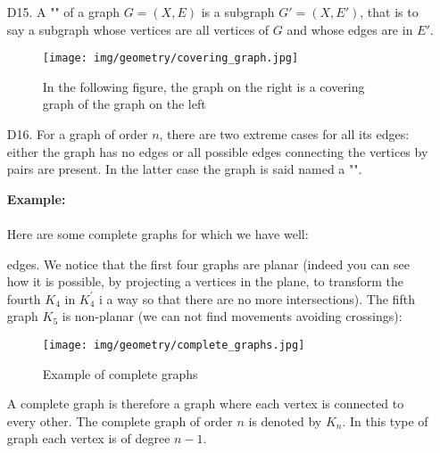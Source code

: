 {\begin{enumerate}
	If $G'$ is a subgraph of $G$ and $u$ and $w$ are vertices of $G'$, then by the definition of a subgraph, $u$ and $w$ are also vertices of $G$. However, if $u$ and $w$ are adjacent in $G$ (i.e., there is an edge of $G$ joining them), the definition of subgraph does not require that the edge joining them in $G$ is also an edge of $G'$. If the subgraph $g'$ has the property that whenever two of its vertices are joined by an edge in $G$, this edge is also in $G'$, then we say that $G'$ is an induced subgraph. 
	
	Here is an example of two subgraphs of G, defined on the same set of vertices where one is an induced subgraph and the other isn't:
	
	\begin{figure}[H]
		\centering
		\texttt{[image: img/geometry/subgraph\_inducedsubgraph.jpg]}
		\caption{Left is a subgraph, right is an induced graph}
	\end{figure}
	
	\item[D15.] A "" of a graph $G=(X,E)$ is a subgraph $G'=(X,E')$, that is to say a subgraph whose vertices are all vertices of $G$ and whose edges are in $E'$.
	
	\begin{figure}[H]
		\centering
		\texttt{[image: img/geometry/covering\_graph.jpg]}
		\caption[]{In the following figure, the graph on the right is a covering graph of the graph on the left}
	\end{figure}
	
	\item[D16.] For a graph of order $n$, there are two extreme cases for all its edges: either the graph has no edges or all possible edges connecting the vertices by pairs are present. In the latter case the graph is said named a "".
	\begin{tcolorbox}[colframe=black,colback=white,sharp corners]
	\textbf{{\Large {}}Example:}\\\\
	Here are some complete graphs for which we have well:
	
	edges. We notice that the first four graphs are planar (indeed you can see how it is possible, by projecting a vertices in the plane, to transform the fourth $K_4$ in $K_4^{'}$ i a way so that there are no more intersections). The fifth graph $K_5$ is non-planar (we can not find movements avoiding crossings):
	\begin{figure}[H]
		\centering
		\texttt{[image: img/geometry/complete\_graphs.jpg]}
		\caption{Example of complete graphs}
	\end{figure}
	A complete graph is therefore a graph where each vertex is connected to every other. The complete graph of order $n$ is denoted by $K_n$. In this type of graph each vertex is of degree $n-1$.
	\end{tcolorbox}
	

\end{enumerate}}
